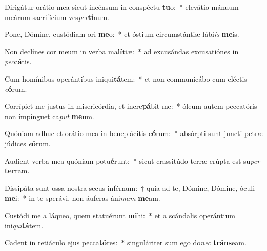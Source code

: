 \item Dirigátur orátio mea sicut incénsum in conspéctu \textbf{tu}o:~* elevátio mánuum meárum sacrifícium ves\textit{per}\textbf{tí}num.
\item Pone, Dómine, custódiam ori \textbf{me}o:~* et óstium circumstántiæ lábi\textit{is} \textbf{me}is.
\item Non declínes cor meum in verba ma\textbf{lí}tiæ:~* ad excusándas excusatiónes in \textit{pec}\textbf{cá}tis.
\item Cum homínibus operántibus iniqui\textbf{tá}tem:~* et non communicábo cum eléctis \textit{e}\textbf{ó}rum.
\item Corrípiet me justus in misericórdia, et incre\textbf{pá}bit me:~* óleum autem peccatóris non impínguet ca\textit{put} \textbf{me}um.
\item Quóniam adhuc et orátio mea in beneplácitis e\textbf{ó}rum:~* absórpti sunt juncti petræ júdices \textit{e}\textbf{ó}rum.
\item Audient verba mea quóniam potu\textbf{é}runt:~* sicut crassitúdo terræ erúpta est su\textit{per} \textbf{ter}ram.
\item Dissipáta sunt ossa nostra secus inférnum:~† quia ad te, Dómine, Dómine, óculi \textbf{me}i:~* in te sperávi, non áuferas áni\textit{mam} \textbf{me}am.
\item Custódi me a láqueo, quem statuérunt \textbf{mi}hi:~* et a scándalis operántium ini\textit{qui}\textbf{tá}tem.
\item Cadent in retiáculo ejus pecca\textbf{tó}res:~* singuláriter sum ego do\textit{nec} \textbf{tráns}eam.
